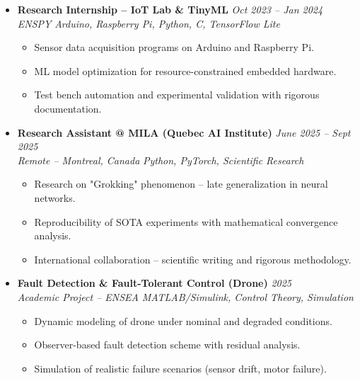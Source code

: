 \documentclass[a4paper,11pt]{article}
\begin{document}
\begin{itemize}[leftmargin=*, label={-}]
\item \textbf{Research Internship -- IoT Lab \& TinyML} \hfill \textit{Oct 2023 -- Jan 2024} \\
\textit{ENSPY} \hfill \textit{Arduino, Raspberry Pi, Python, C, TensorFlow Lite}
\vspace{-2pt}
    \begin{itemize}[leftmargin=0.4cm, nosep, label=\tiny$\bullet$]
        \item \small{Sensor data acquisition programs on Arduino and Raspberry Pi.}
        \item \small{ML model optimization for resource-constrained embedded hardware.}
        \item \small{Test bench automation and experimental validation with rigorous documentation.}
    \end{itemize}
\vspace{3pt}

\item \textbf{Research Assistant @ MILA (Quebec AI Institute)} \hfill \textit{June 2025 -- Sept 2025} \\
\textit{Remote -- Montreal, Canada} \hfill \textit{Python, PyTorch, Scientific Research}
\vspace{-2pt}
    \begin{itemize}[leftmargin=0.4cm, nosep, label=\tiny$\bullet$]
        \item \small{Research on "Grokking" phenomenon -- late generalization in neural networks.}
        \item \small{Reproducibility of SOTA experiments with mathematical convergence analysis.}
        \item \small{International collaboration -- scientific writing and rigorous methodology.}
    \end{itemize}
\vspace{3pt}

\item \textbf{Fault Detection \& Fault-Tolerant Control (Drone)} \hfill \textit{2025} \\
\textit{Academic Project -- ENSEA} \hfill \textit{MATLAB/Simulink, Control Theory, Simulation}
\vspace{-2pt}
    \begin{itemize}[leftmargin=0.4cm, nosep, label=\tiny$\bullet$]
        \item \small{Dynamic modeling of drone under nominal and degraded conditions.}
        \item \small{Observer-based fault detection scheme with residual analysis.}
        \item \small{Simulation of realistic failure scenarios (sensor drift, motor failure).}
    \end{itemize}
\vspace{3pt}


\end{itemize}
\end{document}
